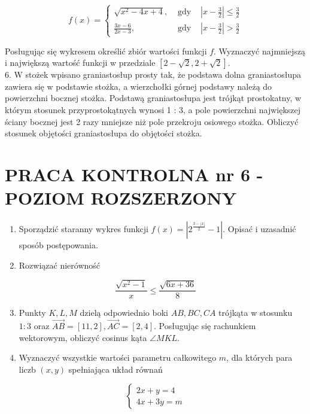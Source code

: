 \documentclass[10pt]{article}
\begin{document}
$$
f(x)=\left\{\begin{array}{lll}
\sqrt{x^{2}-4 x+4}, & \text { gdy } & \left|x-\frac{3}{2}\right| \leqslant \frac{3}{2} \\
\frac{3 x-6}{2 x-3}, & \text { gdy } & \left|x-\frac{3}{2}\right|>\frac{3}{2}
\end{array}\right.
$$

Posługując się wykresem określić zbiór wartości funkcji $f$. Wyznaczyć najmniejszą i największą wartość funkcji w przedziale $[2-\sqrt{2}, 2+\sqrt{2}]$.\\
6. W stożek wpisano graniastosłup prosty tak, że podstawa dolna graniastosłupa zawiera się w podstawie stożka, a wierzchołki górnej podstawy należą do powierzchni bocznej stożka. Podstawą graniastosłupa jest trójkąt prostokatny, w którym stosunek przyprostokątnych wynosi 1 : 3, a pole powierzchni największej ściany bocznej jest 2 razy mniejsze niż pole przekroju osiowego stożka. Obliczyć stosunek objętości graniastosłupa do objętości stożka.

\section*{PRACA KONTROLNA nr 6 - POZIOM ROZSZERZONY}
\begin{enumerate}
  \item Sporządzić staranny wykres funkcji $f(x)=\left|2^{\frac{3-|x|}{2}}-1\right|$. Opisać i uzasadnić sposób postępowania.
  \item Rozwiązać nierówność
\end{enumerate}

$$
\frac{\sqrt{x^{2}-1}}{x} \leqslant \frac{\sqrt{6 x+36}}{8}
$$

\begin{enumerate}
  \setcounter{enumi}{2}
  \item Punkty $K, L, M$ dzielą odpowiednio boki $A B, B C, C A$ trójkąta w stosunku $1: 3$ oraz $\overrightarrow{A B}=[11,2], \overrightarrow{A C}=[2,4]$. Posługując się rachunkiem wektorowym, obliczyć cosinus kąta $\angle M K L$.
  \item Wyznaczyć wszystkie wartości parametru całkowitego $m$, dla których para liczb $(x, y)$ spełniająca układ równań
\end{enumerate}

$$
\left\{\begin{array}{l}
2 x+y=4 \\
4 x+3 y=m
\end{array}\right.
$$
\end{document}
